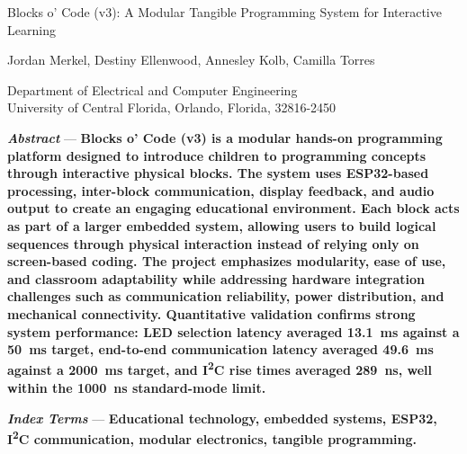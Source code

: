 \documentclass[10pt, conference]{IEEEtran}
\begin{document}
\begin{center}
    \vspace*{6pt}
    {\fontsize{18}{22}\selectfont Blocks o' Code (v3): A Modular Tangible Programming System for Interactive Learning\par}
    \vspace{6pt}
    
    {\fontsize{12}{14}\selectfont Jordan Merkel, Destiny Ellenwood, Annesley Kolb, Camilla Torres\par}
    \vspace{6pt}
    
    {\fontsize{12}{14}\selectfont Department of Electrical and Computer Engineering\\
    University of Central Florida, Orlando, Florida, 32816-2450\par}
    \vspace{12pt}
\end{center}

{\fontsize{9}{10}\selectfont
\noindent\hspace{0.125in}\textbf{\textit{Abstract}} --- \textbf{Blocks o' Code (v3) is a modular hands-on programming platform designed to introduce children to programming concepts through interactive physical blocks. The system uses ESP32-based processing, inter-block communication, display feedback, and audio output to create an engaging educational environment. Each block acts as part of a larger embedded system, allowing users to build logical sequences through physical interaction instead of relying only on screen-based coding. The project emphasizes modularity, ease of use, and classroom adaptability while addressing hardware integration challenges such as communication reliability, power distribution, and mechanical connectivity. Quantitative validation confirms strong system performance: LED selection latency averaged 13.1~ms against a 50~ms target, end-to-end communication latency averaged 49.6~ms against a 2000~ms target, and I\textsuperscript{2}C rise times averaged 289~ns, well within the 1000~ns standard-mode limit.}\par}
\vspace{10pt} %

{\fontsize{9}{10}\selectfont
\noindent\hspace{0.125in}\textbf{\textit{Index Terms}} --- \textbf{Educational technology, embedded systems, ESP32, I\textsuperscript{2}C communication, modular electronics, tangible programming.}\par}
\vspace{12pt} %
\end{document}
